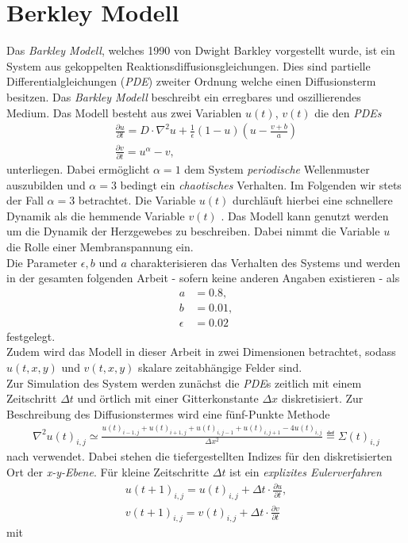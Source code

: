 \section{Berkley Modell}
Das \textit{Barkley Modell}, welches 1990 von Dwight Barkley vorgestellt wurde, ist ein System aus gekoppelten Reaktionsdiffusionsgleichungen. Dies sind partielle Differentialgleichungen (\textit{PDE}) zweiter Ordnung welche einen Diffusionsterm besitzen. Das \textit{Barkley Modell} beschreibt ein erregbares und oszillierendes Medium. Das Modell besteht aus zwei Variablen $u(t)$, $v(t)$ die den  \textit{PDEs}
\begin{equation}
\begin{gathered}
\frac{\partial u}{\partial t} = D \cdot \nabla^2 u + \frac{1}{\epsilon} (1-u) \left(u-\frac{v+b}{a}\right)\\
\frac{\partial v}{\partial t} = u^\alpha-v,
\end{gathered}
\end{equation}
unterliegen. Dabei ermöglicht $\alpha=1$ dem System \textit{periodische} Wellenmuster auszubilden und $\alpha=3$ bedingt ein \textit{chaotisches} Verhalten. Im Folgenden wir stets der Fall $\alpha=3$ betrachtet. Die Variable $u(t)$ durchläuft hierbei eine schnellere Dynamik als die hemmende Variable $v(t)$ \citep{Barkley:2008, berg2011synchronization}. Das Modell kann genutzt werden um die Dynamik der Herzgewebes zu beschreiben. Dabei nimmt die Variable $u$ die Rolle einer Membranspannung ein.\\
Die Parameter $\epsilon, b$ und $a$ charakterisieren das Verhalten des Systems und werden in der gesamten folgenden Arbeit - sofern keine anderen Angaben existieren - als
\begin{align*}
a &= 0.8,\\ b &= 0.01,\\ \epsilon &= 0.02
\end{align*}
festgelegt.\\
Zudem wird das Modell in dieser Arbeit in zwei Dimensionen betrachtet, sodass $u(t, x,y)$ und $v(t, x,y)$ skalare zeitabhängige Felder sind.\\
Zur Simulation des System werden zunächst die \textit{PDE}s zeitlich mit einem Zeitschritt $\Delta t$ und örtlich mit einer Gitterkonstante $\Delta x$ diskretisiert. Zur Beschreibung des Diffusionstermes wird eine fünf-Punkte Methode
\begin{align}
\nabla^2 u(t)_{i,j} \simeq \frac{u(t)_{i-1, j} + u(t)_{i+1,j} + u(t)_{i,j-1} + u(t)_{i,j+1} - 4 u(t)_{i,j}}{\Delta x^2} \eqdef \Sigma(t)_{i,j}
\end{align} 
nach \citep{Barkley:2008} verwendet. Dabei stehen die tiefergestellten Indizes für den diskretisierten Ort der \textit{x-y-Ebene}.
Für kleine Zeitschritte $\Delta t$ ist ein \textit{explizites Eulerverfahren}
\begin{equation}
\begin{gathered}
u(t+1)_{i,j} = u(t)_{i,j} + \Delta t \cdot \frac{\partial u}{\partial t},\\
v(t+1)_{i,j} = v(t)_{i,j} + \Delta t \cdot \frac{\partial v}{\partial t}
\end{gathered}
\end{equation}
mit

